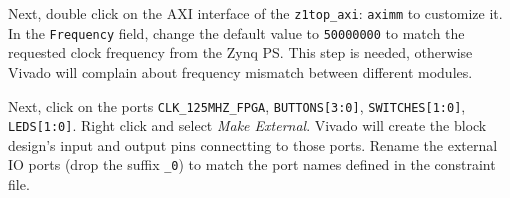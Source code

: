 \documentclass[11pt]{article}
\begin{document}
\begin{center}
\end{center}

Next, double click on the AXI interface of the \verb|z1top_axi|: \verb|aximm| to customize it. In the \texttt{Frequency} field, change the default value to \texttt{50000000} to match the requested clock frequency from the Zynq PS. This step is needed, otherwise Vivado will complain about frequency mismatch between different modules.

\begin{center}
\end{center}

Next, click on the ports \verb|CLK_125MHZ_FPGA|, \verb|BUTTONS[3:0]|, \verb|SWITCHES[1:0]|, \verb|LEDS[1:0]|. Right click and select \emph{Make External}. Vivado will create the block design's input and output pins connectting to those ports. Rename the external IO ports (drop the suffix \verb|_0|) to match the port names defined in the constraint file.

\begin{center}
\end{center}
\end{document}
